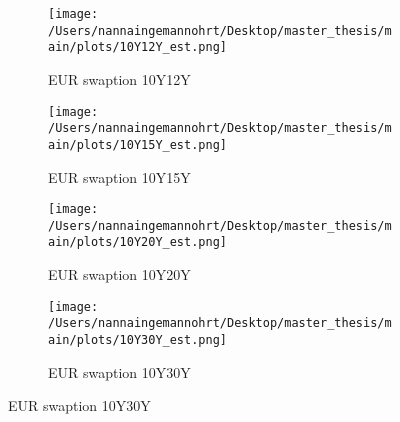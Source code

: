\begin{figure}[htbp]
    \begin{subfigure}{0.43\textwidth}
        \texttt{[image: /Users/nannaingemannohrt/Desktop/master\_thesis/main/plots/10Y12Y\_est.png]}
        \caption{EUR swaption 10Y12Y}
        \label{fig:10Y12Y_}
    \end{subfigure}\hfill
    \begin{subfigure}{0.43\textwidth}
        \texttt{[image: /Users/nannaingemannohrt/Desktop/master\_thesis/main/plots/10Y15Y\_est.png]}
        \caption{EUR swaption 10Y15Y}
        \label{fig:10Y15Y_}
    \end{subfigure}
    \begin{subfigure}{0.43\textwidth}
        \texttt{[image: /Users/nannaingemannohrt/Desktop/master\_thesis/main/plots/10Y20Y\_est.png]}
        \caption{EUR swaption 10Y20Y}
        \label{fig:10Y20Y_}
    \end{subfigure}\hfill
    \begin{subfigure}{0.43\textwidth}
        \texttt{[image: /Users/nannaingemannohrt/Desktop/master\_thesis/main/plots/10Y30Y\_est.png]}
        \caption{EUR swaption 10Y30Y}
        \label{fig:10Y30Y_}
    \end{subfigure}

\end{figure}   